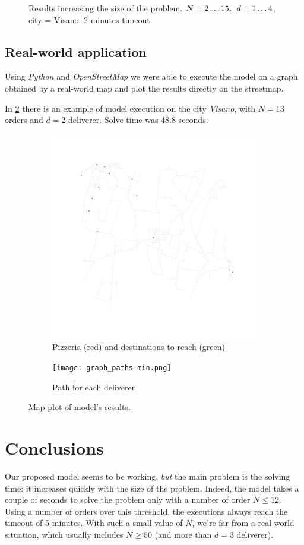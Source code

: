 \documentclass[10pt]{article}
\begin{document}
\begin{figure}
		\caption{Results increasing the size of the problem.
			$N = 2\dots15,\hspace{.5em} d=1\dots4$, city = Visano. 
			2 minutes timeout.}
        \label{fig:increasing-problem}
	\end{figure}

	\subsection{Real-world application}

	Using \textit{Python} and \textit{OpenStreetMap} we were able to execute the model
	on a graph obtained by a real-world map and plot the results directly on the streetmap.
	
	In \cref{fig:maps} there is an example of model execution on the city \textit{Visano}, 
	with $N = 13$ orders and $d = 2$ deliverer. Solve time was 48.8 seconds.

	\begin{figure}
		\begin{subfigure}[t]{1\textwidth}
			\centering
			\includegraphics[width=.6\textwidth]{graph.png}
			\caption{Pizzeria (red) and destinations to reach (green)}

		\end{subfigure}
			\begin{subfigure}[t]{1\textwidth}
				\centering
				\texttt{[image: graph\_paths-min.png]}
			\caption{Path for each deliverer}
		\end{subfigure}

		\caption{Map plot of model's results.}
        \label{fig:maps}
	\end{figure}



	\section{Conclusions} 
	\label{sec:conclusions}
	Our proposed model seems to be working, \textit{but} the main problem is the solving time: 
	it increases quickly 
	with the size of the problem. Indeed, the model takes a couple of seconds to solve the problem
	only with a number of order $N \le 12$. Using a number of orders over this threshold, 
	the executions always reach the timeout of 5 minutes. With such a small value of $N$,
	we're far from a real world situation, which usually includes $N \ge 50$ (and more
	than $d = 3$ deliverer).
\end{document}

